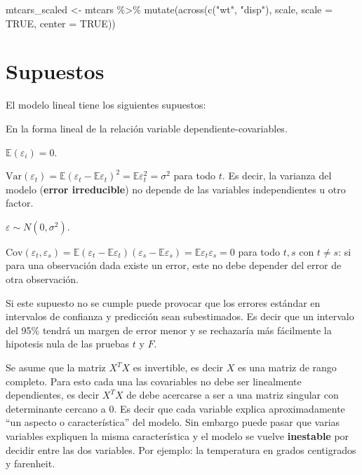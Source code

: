 \documentclass[
  12pt,
]{book}
\newenvironment{Shaded}{\begin{snugshade}}{\end{snugshade}}
\newcommand{\AttributeTok}[1]{\textcolor[rgb]{0.77,0.63,0.00}{#1}}
\newcommand{\ConstantTok}[1]{\textcolor[rgb]{0.00,0.00,0.00}{#1}}
\newcommand{\FunctionTok}[1]{\textcolor[rgb]{0.00,0.00,0.00}{#1}}
\newcommand{\NormalTok}[1]{#1}
\newcommand{\OtherTok}[1]{\textcolor[rgb]{0.56,0.35,0.01}{#1}}
\newcommand{\SpecialCharTok}[1]{\textcolor[rgb]{0.00,0.00,0.00}{#1}}
\newcommand{\StringTok}[1]{\textcolor[rgb]{0.31,0.60,0.02}{#1}}
\providecommand{\tightlist}{%
  \setlength{\itemsep}{0pt}\setlength{\parskip}{0pt}}
\theoremstyle{definition}
\theoremstyle{definition}
\theoremstyle{definition}
\theoremstyle{definition}
\theoremstyle{remark}
\begin{document}
\begin{Shaded}
\begin{Highlighting}[]
\NormalTok{mtcars\_scaled }\OtherTok{\textless{}{-}}\NormalTok{ mtcars }\SpecialCharTok{\%\textgreater{}\%}
    \FunctionTok{mutate}\NormalTok{(}\FunctionTok{across}\NormalTok{(}\FunctionTok{c}\NormalTok{(}\StringTok{"wt"}\NormalTok{, }\StringTok{"disp"}\NormalTok{), scale, }\AttributeTok{scale =} \ConstantTok{TRUE}\NormalTok{,}
        \AttributeTok{center =} \ConstantTok{TRUE}\NormalTok{))}
\end{Highlighting}
\end{Shaded}

\hypertarget{supuestos}{%
\section{Supuestos}\label{supuestos}}

El modelo lineal tiene los siguientes supuestos:

\begin{description}
\tightlist
\item[Linealidad]
En la forma lineal de la relación variable dependiente-covariables.
\item[Errores centrados]
\(\mathbb{E}(\varepsilon_i) = 0\).
\item[Homocedasticidad]
\(\text{Var}(\varepsilon_t) = \mathbb{E}(\varepsilon_t - \mathbb{E} \varepsilon_t)^2 = \mathbb{E} \varepsilon_t^2 = \sigma^2\) para todo \(t\). Es decir, la varianza del modelo (\textbf{error irreducible}) no depende de las variables independientes u otro factor.
\item[Normalidad de los residuos]
\(\varepsilon \sim N(0, \sigma^2 )\).
\item[Independencia de los errores]
\(\text{Cov}(\varepsilon_t,\varepsilon_s ) = \mathbb{E} (\varepsilon_t - \mathbb{E} \varepsilon_t) (\varepsilon_s - \mathbb{E} \varepsilon_s) = \mathbb{E} \varepsilon_t \varepsilon_s = 0\) para todo \(t,s\) con \(t\neq s\): si para una observación dada existe un error, este no debe depender del error de otra observación.
\end{description}

Si este supuesto no se cumple puede provocar que los errores estándar en intervalos de confianza y predicción sean subestimados. Es decir que un intervalo del 95\% tendrá un margen de error menor y se rechazaría más fácilmente la hipotesis nula de las pruebas \(t\) y \(F\).

\begin{description}
\tightlist
\item[Multicolinealidad]
Se asume que la matriz \(X^TX\) es invertible, es decir \(X\) es una matriz de rango completo. Para esto cada una las covariables no debe ser linealmente dependientes, es decir \(X^TX\) de debe acercarse a ser a una matriz singular con determinante cercano a 0. Es decir que cada variable explica aproximadamente ``un aspecto o característica'' del modelo. Sin embargo puede pasar que varias variables expliquen la misma característica y el modelo se vuelve \textbf{inestable} por decidir entre las dos variables. Por ejemplo: la temperatura en grados centigrados y farenheit.
\end{description}
\end{document}
